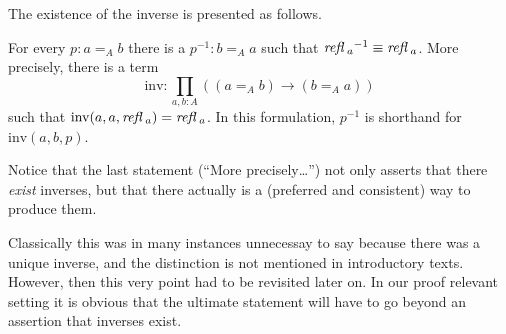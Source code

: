 The existence of the inverse is presented as follows.  
\begin{lemma}
  For every $p:a=_Ab$ there is a $p^{-1}:b=_Aa$ such that $\mathop{{\it refl}}{}_a{}^{-1}\equiv\mathop{{\it refl}}{}_a$.  More precisely, there is a term 
$$\mathrm{inv}:\prod_{a,b:A}((a=_Ab)\to(b=_Aa))$$
such that $\mathrm{inv}(a,a,\mathop{{\it refl}}{}_a)=\mathop{{\it refl}}{}_a$. In this formulation, $p^{-1}$ is shorthand for $\mathrm{inv}(a,b,p)$.
\end{lemma}

\begin{remark}
  Notice that the last statement  (``More precisely\dots'')  not only asserts that there {\em exist} inverses, but that there actually is a (preferred and consistent) way to produce them.  

Classically this was in many instances unnecessay to say because there was a unique inverse, and the distinction is not mentioned in introductory texts.  However, then this very point had to be revisited later on.  In our proof relevant setting it is obvious that the ultimate statement will have to go beyond an assertion that inverses exist.
\end{remark}